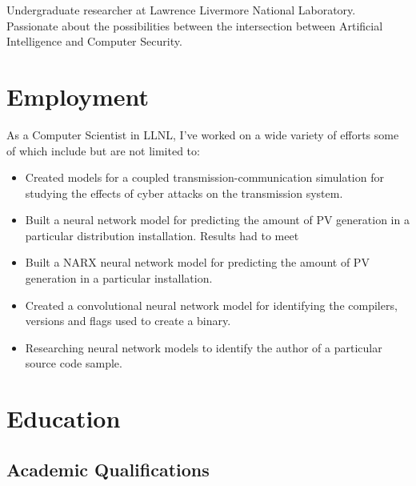 \documentclass[12pt,a4paper,roman]{moderncv}        %
\begin{document}
\makecvtitle

\small{Undergraduate researcher at Lawrence Livermore National Laboratory. Passionate about the possibilities between the intersection between Artificial Intelligence and Computer Security.}

\section{Employment}

\vspace{5pt}

As a Computer Scientist in LLNL, I've worked on a wide variety of efforts some of which include but are not limited to:
\begin{itemize}
	\item Created models for a coupled transmission-communication simulation for studying the effects of cyber attacks on the transmission system. 
	
	\item Built a neural network model for predicting the amount of PV generation in a particular distribution installation. Results had to meet 
	
	\item Built a NARX neural network model for predicting the amount of PV generation in a particular installation.
	
	\item Created a convolutional neural network model for identifying the compilers, versions and flags used to create a binary.  

	\item Researching neural network models to identify the author of a particular source code sample. 
\end{itemize}

\section{Education}

\subsection{Academic Qualifications}
\end{document}
